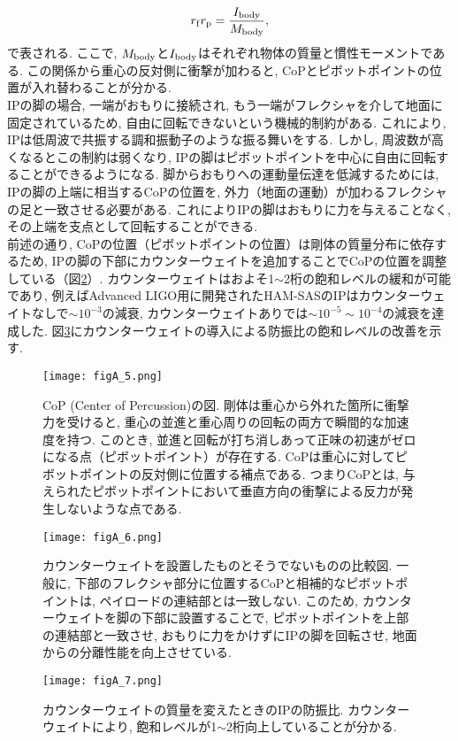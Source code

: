 \begin{equation}
r_{\rm f}r_{\rm p}=\frac{I_{\rm body}}{M_{\rm body}},
\label{figA.5}
\end{equation}
で表される\cite{cop}. ここで, $M_{\rm body}$と$I_{\rm body}$はそれぞれ物体の質量と慣性モーメントである. この関係から重心の反対側に衝撃が加わると, CoPとピボットポイントの位置が入れ替わることが分かる. \\
\quad IPの脚の場合, 一端がおもりに接続され, もう一端がフレクシャを介して地面に固定されているため, 自由に回転できないという機械的制約がある. これにより, IPは低周波で共振する調和振動子のような振る舞いをする. しかし, 周波数が高くなるとこの制約は弱くなり, IPの脚はピボットポイントを中心に自由に回転することができるようになる. 脚からおもりへの運動量伝達を低減するためには, IPの脚の上端に相当するCoPの位置を, 外力（地面の運動）が加わるフレクシャの足と一致させる必要がある. これによりIPの脚はおもりに力を与えることなく, その上端を支点として回転することができる. \\
\quad 前述の通り, CoPの位置（ピボットポイントの位置）は剛体の質量分布に依存するため, IPの脚の下部にカウンターウェイトを追加することでCoPの位置を調整している（図\ref{figA.6}）. カウンターウェイトはおよそ1$\sim$2桁の飽和レベルの緩和が可能であり, 例えばAdvanced LIGO用に開発されたHAM-SASのIPはカウンターウェイトなしで$\sim10^{-3}$の減衰, カウンターウェイトありでは$\sim10^{-5}\sim10^{-4}$の減衰を達成した. 図\ref{figA.7}にカウンターウェイトの導入による防振比の飽和レベルの改善を示す. 
\begin{figure}[H]
\begin{center}
\texttt{[image: figA\_5.png]} 
\caption[CoP (Center of Percussion)]{CoP (Center of Percussion)の図. 剛体は重心から外れた箇所に衝撃力を受けると, 重心の並進と重心周りの回転の両方で瞬間的な加速度を持つ. このとき, 並進と回転が打ち消しあって正味の初速がゼロになる点（ピボットポイント）が存在する. CoPは重心に対してピボットポイントの反対側に位置する補点である. つまりCoPとは, 与えられたピボットポイントにおいて垂直方向の衝撃による反力が発生しないような点である. }
\label{figA.5}
\end{center}
\end{figure}
\begin{figure}[H]
\begin{center}
\texttt{[image: figA\_6.png]} 
\caption[カウンターウェイト]{カウンターウェイトを設置したものとそうでないものの比較図. 一般に, 下部のフレクシャ部分に位置するCoPと相補的なピボットポイントは, ペイロードの連結部とは一致しない. このため, カウンターウェイトを脚の下部に設置することで, ピボットポイントを上部の連結部と一致させ, おもりに力をかけずにIPの脚を回転させ, 地面からの分離性能を向上させている. }
\label{figA.6}
\end{center}
\end{figure}
\begin{figure}[H]
\begin{center}
\texttt{[image: figA\_7.png]} 
\caption[カウンターウェイトの質量を変えたときのIPの防振比]{カウンターウェイトの質量を変えたときのIPの防振比. カウンターウェイトにより, 飽和レベルが1$\sim$2桁向上していることが分かる. }
\label{figA.7}
\end{center}
\end{figure}
